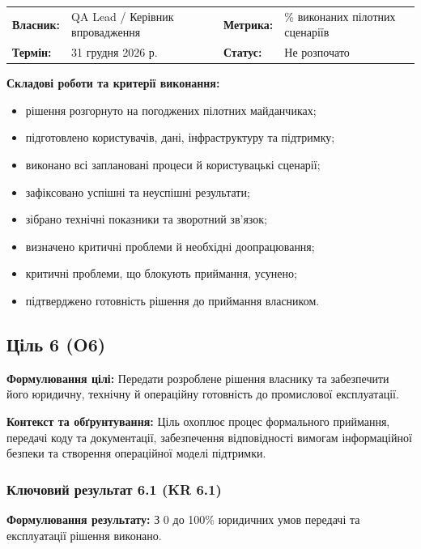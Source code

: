 \documentclass{article}
\begin{document}
\noindent\begin{tabular}{@{}p{2.2cm}p{4.5cm}p{2.2cm}p{4.5cm}@{}}
\toprule
\textbf{Власник:} & QA Lead / Керівник впровадження & \textbf{Метрика:} & \% виконаних пілотних сценаріїв \\
\textbf{Термін:} & 31 грудня 2026 р. & \textbf{Статус:} & Не розпочато \\
\bottomrule
\end{tabular}

\vspace{10pt}
\textbf{Складові роботи та критерії виконання:}
\begin{itemize}
    \item рішення розгорнуто на погоджених пілотних майданчиках;
    \item підготовлено користувачів, дані, інфраструктуру та підтримку;
    \item виконано всі заплановані процеси й користувацькі сценарії;
    \item зафіксовано успішні та неуспішні результати;
    \item зібрано технічні показники та зворотний зв’язок;
    \item визначено критичні проблеми й необхідні доопрацювання;
    \item критичні проблеми, що блокують приймання, усунено;
    \item підтверджено готовність рішення до приймання власником.
\end{itemize}

\newpage

\subsection{Ціль 6 (O6)}

\textbf{Формулювання цілі:} Передати розроблене рішення власнику та забезпечити його юридичну, технічну й операційну готовність до промислової експлуатації.

\textbf{Контекст та обґрунтування:}
Ціль охоплює процес формального приймання, передачі коду та документації, забезпечення відповідності вимогам інформаційної безпеки та створення операційної моделі підтримки.

\subsubsection{Ключовий результат 6.1 (KR 6.1)}

\textbf{Формулювання результату:} З 0 до 100\% юридичних умов передачі та експлуатації рішення виконано.
\end{document}
